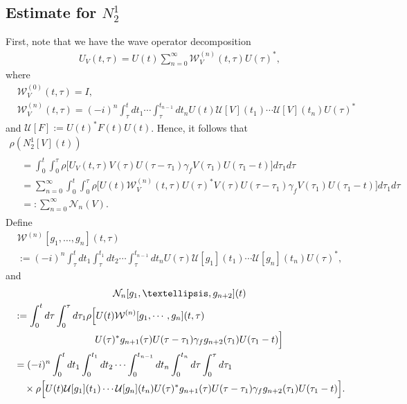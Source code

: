 \documentclass[10pt,a4paper]{amsart}
\newcommand{\CN}{\mathcal{N}}
\newcommand{\CU}{\mathcal{U}}
\newcommand{\CW}{\mathcal{W}}
\newcommand{\ga}{\gamma}
\newcommand{\ta}{\tau}
\newcommand{\rh}{\rho}
\newcommand{\I}{\infty}
\begin{document}
\subsection{Estimate for \texorpdfstring{$N_2^1$}{N21}} 

First, note that we have the wave operator decomposition
\begin{align}\label{eq:wave expansion}
U_V(t,\ta) = U(t) \sum_{n=0}^\I \CW_V^{(n)}(t,\ta) U(\ta)^*,
\end{align}
where
\begin{align}
&\CW_V^{(0)}(t,\ta) = I, \\
&\CW_V^{(n)}(t,\ta) = (-i)^n \int_{\ta}^t dt_1 \cdots \int_{\ta}^{t_{n-1}} dt_n U(t) \CU[V](t_1) \cdots \CU[V](t_n) U(\ta)^*
\end{align}
and $\CU[F]:= U(t)^* F(t) U(t)$. Hence, it follows that
\begin{multline}
\rh\left(N_2^1[V](t)\right) \\
\begin{aligned}
&= \int_0^t \int_0^\ta \rh\big[U_V(t,\ta)V(\ta)U(\ta-\ta_1) \ga_f V(\ta_1) U(\ta_1-t)\big] d\ta_1 d\ta \\
&= \sum_{n=0}^\I \int_0^t \int_0^\ta
\rh \Big[U(t) \CW_V^{(n)}(t,\ta) U(\ta)^* V(\ta)U(\ta-\ta_1) \ga_f V(\ta_1) U(\ta_1-t) \Big] d\ta_1 d\ta \\
&=: \sum_{n=0}^\I \CN_n(V).
\end{aligned}
\end{multline}
Define
\begin{multline}
\CW^{(n)}[g_1,\dots,g_n](t,\ta)\\
 := (-i)^n \int_{\ta}^t dt_1 \int_{\ta}^{t_1} dt_2 \cdots \int_{\ta}^{t_{n-1}} dt_n U(\ta) \CU[g_1](t_1) \cdots \CU[g_n](t_n) U(\ta)^*,
\end{multline}
and
\begin{multline}
\CN_n[g_1, \dots, g_{n+2}](t) \\
\begin{aligned}
&:= \int_0^t d\ta \int_0^\ta d\ta_1
\rh \Big[U(t) \CW^{(n)}[g_1,\cdots,g_n](t,\ta)\\ &\mkern150mu U(\ta)^* g_{n+1}(\ta)U(\ta-\ta_1)
\ga_f g_{n+2}(\ta_1) U(\ta_1-t) \Big] \\
& = (-i)^{n} \int_0^t dt_1 \int_0^{t_1}dt_2 \cdots \int_0^{t_{n-1}} dt_n \int_0^{t_n} d\ta \int_0^\ta d\ta_1 \\
&\quad \times \rh \Big[U(t) \CU[g_1](t_1) \cdots \CU[g_n](t_n) U(\ta)^* g_{n+1}(\ta) U(\ta-\ta_1)\ga_f g_{n+2}(\ta_1) U(\ta_1-t) \Big].
\end{aligned}
\end{multline}
\end{document}
